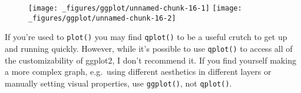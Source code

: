 \begin{figure}[H]
  \texttt{[image: \_figures/ggplot/unnamed-chunk-16-1]}%
  \texttt{[image: \_figures/ggplot/unnamed-chunk-16-2]}
\end{figure}

If you're used to \texttt{plot()} you may find \texttt{qplot()} to be a
useful crutch to get up and running quickly. However, while it's
possible to use \texttt{qplot()} to access all of the customizability of
ggplot2, I don't recommend it. If you find yourself making a more
complex graph, e.g.~using different aesthetics in different layers or
manually setting visual properties, use \texttt{ggplot()}, not
\texttt{qplot()}.
